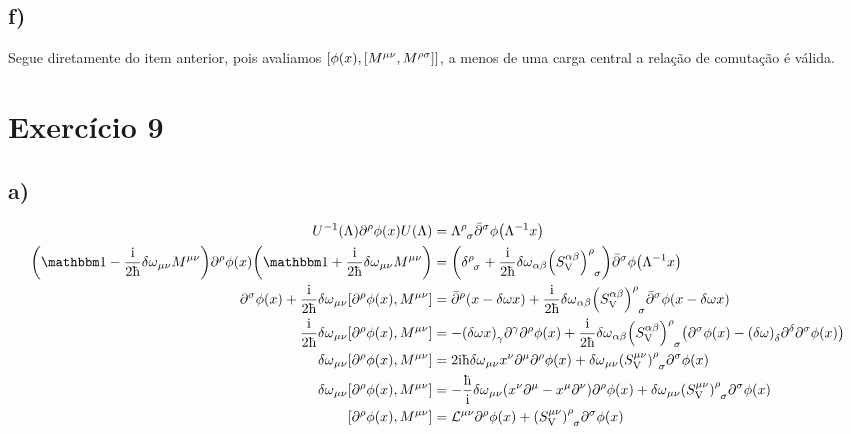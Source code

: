 \documentclass[twoside]{amsart}
\numberwithin{equation}{section}
\begin{document}
\subsection*{\textbf{f)}}

Segue diretamente do item anterior, pois avaliamos $\comm{\phi\qty(x)}{\comm{M^{\mu\nu}}{M^{\rho\sigma}}}$, a menos 
de uma carga central a relação de comutação é válida.


\section{Exercício 9}

\subsection*{\textbf{a)}}

\begin{align*}
    U^{-1}\qty(\Lambda)\partial^\rho\phi\qty(x)U\qty(\Lambda)&=\tensor{\Lambda}{^\rho_\sigma}{\bar\partial}^\sigma\phi\qty(\Lambda^{-1}x)\\
    \qty(\mathbbm 1-\frac{\im}{2\hbar}{\delta\omega}_{\mu\nu}M^{\mu\nu})\partial^\rho\phi\qty(x)\qty(\mathbbm 1+\frac{\im}{2\hbar}{\delta\omega}_{\mu\nu}M^{\mu\nu})&=\qty(\tensor{\delta}{^\rho_\sigma}+\frac{\im}{2\hbar}{\delta\omega}_{\alpha\beta}\tensor{\qty(S^{\alpha\beta}_{\textnormal{V}})}{^\rho_\sigma}){\bar\partial}^\sigma\phi\qty(\Lambda^{-1}x)\\
    \partial^\sigma\phi\qty(x)+\frac{\im}{2\hbar}{\delta\omega}_{\mu\nu}\comm{\partial^\rho\phi\qty(x)}{M^{\mu\nu}}&={\bar\partial}^\rho\qty(x-\delta\omega x)+\frac{\im}{2\hbar}{\delta\omega}_{\alpha\beta}\tensor{\qty(S^{\alpha\beta}_{\textnormal V})}{^\rho_\sigma}{\bar\partial}^\sigma\phi\qty(x-\delta\omega x)\\
    \frac{\im}{2\hbar}{\delta\omega}_{\mu\nu}\comm{\partial^\rho\phi\qty(x)}{M^{\mu\nu}}&=-\qty(\delta\omega x)_\gamma\partial^\gamma\partial^\rho\phi\qty(x)+\frac{\im}{2\hbar}{\delta\omega}_{\alpha\beta}\tensor{\qty(S^{\alpha\beta}_{\textnormal{V}})}{^\rho_\sigma}\qty(\partial^\sigma\phi\qty(x)-\qty(\delta\omega)_\delta\partial^\delta\partial^\sigma\phi\qty(x))\\
    {\delta\omega}_{\mu\nu}\comm{\partial^\rho\phi\qty(x)}{M^{\mu\nu}}&=2\im\hbar{\delta\omega}_{\mu\nu}x^\nu\partial^\mu\partial^\rho\phi\qty(x)+{\delta\omega}_{\mu\nu}\tensor{\qty(S^{\mu\nu}_{\textnormal{V}})}{^\rho_\sigma}\partial^\sigma\phi\qty(x)\\
    {\delta\omega}_{\mu\nu}\comm{\partial^\rho\phi\qty(x)}{M^{\mu\nu}}&=-\frac\hbar\im{\delta\omega}_{\mu\nu}\qty(x^\nu\partial^\mu-x^\mu\partial^\nu)\partial^\rho\phi\qty(x)+{\delta\omega}_{\mu\nu}\tensor{\qty(S^{\mu\nu}_{\textnormal{V}})}{^\rho_\sigma}\partial^\sigma\phi\qty(x)\\
    \comm{\partial^\rho\phi\qty(x)}{M^{\mu\nu}}&={\mathcal L}^{\mu\nu}\partial^\rho\phi\qty(x)+\tensor{\qty(S^{\mu\nu}_{\textnormal{V}})}{^\rho_\sigma}\partial^\sigma\phi\qty(x)
\end{align*}
\end{document}
